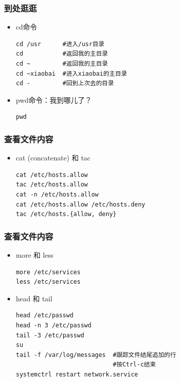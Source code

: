 \documentclass[xcolor=svgnames,presentation]{beamer}
\begin{document}
\begin{frame}[fragile]
\frametitle{到处逛逛}
\label{sec-4-2-11}
\begin{itemize}

\item cd命令\\
\label{sec-4-2-11-1}%
\begin{verbatim}
cd /usr      #进入/usr目录
cd           #返回我的主目录
cd ~         #返回我的主目录
cd ~xiaobai  #进入xiaobai的主目录
cd -         #回到上次去的目录
\end{verbatim}

\item pwd命令：我到哪儿了？\\
\label{sec-4-2-11-2}%
\begin{verbatim}
pwd
\end{verbatim}
\end{itemize} %
\end{frame}
\begin{frame}[fragile]
\frametitle{查看文件内容}
\label{sec-4-2-12}
\begin{itemize}

\item cat (concatenate) 和 tac\\
\label{sec-4-2-12-1}%
\begin{verbatim}
cat /etc/hosts.allow
tac /etc/hosts.allow
cat -n /etc/hosts.allow
cat /etc/hosts.allow /etc/hosts.deny
tac /etc/hosts.{allow, deny}
\end{verbatim}
\end{itemize} %
\end{frame}
\begin{frame}[fragile]
\frametitle{查看文件内容}
\label{sec-4-2-13}
\begin{itemize}

\item more 和 less\\
\label{sec-4-2-13-1}%
\begin{verbatim}
more /etc/services
less /etc/services
\end{verbatim}

\item head 和 tail\\
\label{sec-4-2-13-2}%
\begin{verbatim}
head /etc/passwd
head -n 3 /etc/passwd
tail -3 /etc/passwd
su
tail -f /var/log/messages  #跟踪文件结尾追加的行
                           #按Ctrl-c结束
systemctrl restart network.service
\end{verbatim}
\end{itemize} %
\end{frame}
\end{document}
